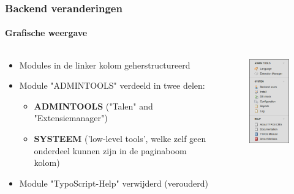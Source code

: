 
\begin{frame}[fragile]
	\frametitle{Backend veranderingen}
	\framesubtitle{Grafische weergave}

	\begin{columns}[T]

		\begin{column}{.5\textwidth}

			\begin{itemize}
				\item Modules in de linker kolom geherstructureerd
				\item Module "ADMINTOOLS" verdeeld in twee delen:

					\begin{itemize}
						\item \textbf{ADMINTOOLS} ("Talen" and "Extensiemanager")
						\item \textbf{SYSTEEM} ('low-level tools', welke zelf geen onderdeel kunnen zijn in de paginaboom kolom)
					\end{itemize}

				\item Module "TypoScript-Help" verwijderd (verouderd)

			\end{itemize}

		\end{column}

		\begin{column}{.5\textwidth}
			\begin{figure}\vspace*{-0.4cm}
				\includegraphics[width=0.35\linewidth]{Images/BackendChanges/AdminTools.png}
			\end{figure}
		\end{column}

	\end{columns}

\end{frame}

